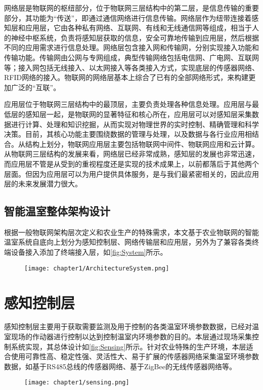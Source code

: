	网络层是物联网的枢纽部分，位于物联网三层结构中的第二层，是信息传输的重要部分，其功能为“传送”，即通过通信网络进行信息传输。网络层作为纽带连接着感知层和应用层，它由各种私有网络、互联网、有线和无线通信网等组成，相当于人的神经中枢系统，负责将感知层获取的信息，安全可靠地传输到应用层，然后根据不同的应用需求进行信息处理。网络层包含接入网和传输网，分别实现接入功能和传输功能。传输网由公网与专网组成，典型传输网络包括电信网、广电网、互联网等；接入网包括无线接入、以太网接入等各类接入方式，实现底层的传感器网络、RFID网络的接入。物联网的网络层基本上综合了已有的全部网络形式，来构建更加广泛的“互联”。
	
	应用层位于物联网三层结构中的最顶层，主要负责处理各种信息处理。应用层与最低层的感知层一起，是物联网的显著特征和核心所在，应用层可以对感知层采集数据进行计算、处理和知识挖掘，从而实现对物理世界的实时控制、精确管理和科学决策。目前，其核心功能主要围绕数据的管理与处理，以及数据与各行业应用相结合。从结构上划分，物联网应用层主要包括物联网中间件、物联网应用和云计算。从物联网三层结构的发展来看，网络层已经非常成熟，感知层的发展也非常迅速，而应用层不管是从受到的重视程度还是实现的技术成果上，以前都落后于其他两个层面。但因为应用层可以为用户提供具体服务，是与我们最紧密相关的，因此应用层的未来发展潜力很大。
	
	\subsection{智能温室整体架构设计}
	根据一般物联网架构层次定义和农业生产的特殊需求，本文基于农业物联网的智能温室系统自底向上划分为感知控制层、网络传输层和应用层，另外为了兼容各类终端设备接入添加了终端接入层\supercite{WangHuaiyu2015}，如\ref{fig:System}所示。
		\begin{figure}[!htp]
  			\centering
 			\texttt{[image: chapter1/ArchitectureSystem.png]}
		\end{figure}
		
\section{感知控制层}
感知控制层主要用于获取需要监测及用于控制的各类温室环境参数数据，已经对温室现场的作动器进行控制以达到控制温室内环境参数的目的。本层通过现场采集控制系统实现，其总体设计如\ref{fig:Sensing}所示。针对农业特殊的生产环境，本层适合使用可靠性高、稳定性强、灵活性大、易于扩展的传感器网络采集温室环境参数数据，如基于RS485总线的传感器网络、基于ZigBee的无线传感器网络等。
		\begin{figure}[!htp]
  			\centering
 			\texttt{[image: chapter1/sensing.png]}
		\end{figure}


